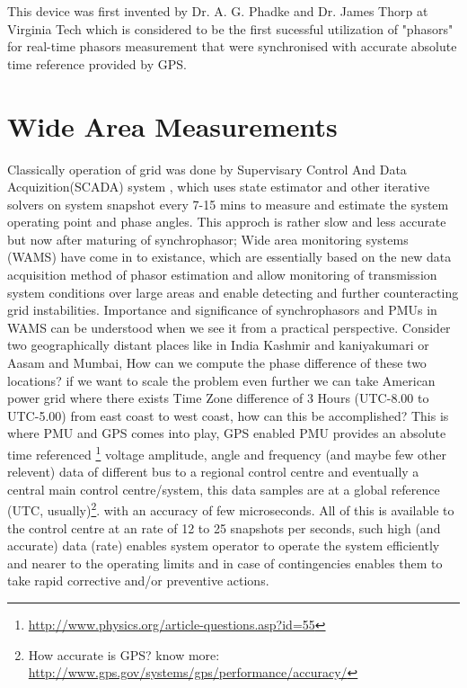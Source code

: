 This device was first invented by Dr. A. G. Phadke and Dr. James Thorp at Virginia Tech which is considered to be the first sucessful utilization of "phasors" for real-time phasors measurement that were synchronised with accurate absolute time reference provided by GPS.

\section{Wide Area Measurements}

Classically operation of grid was done by Supervisary Control And Data Acquizition(SCADA) system , which uses state estimator and other iterative solvers on system snapshot every 7-15 mins to measure and estimate the system operating point and phase angles. This approch is rather slow and less accurate but now after maturing of synchrophasor; Wide area monitoring systems (WAMS) have come in to existance, which are essentially based on the new data acquisition method of phasor estimation and allow monitoring of transmission system conditions over large areas and enable detecting and further counteracting grid instabilities. Importance and significance of synchrophasors and PMUs in WAMS can be understood when we see it from a practical perspective. Consider two geographically distant places like in India Kashmir and kaniyakumari or Aasam and Mumbai, How can we compute the phase difference of these two locations? if we want to scale the problem even further we can take American power grid where there exists Time Zone difference of 3 Hours (UTC-8.00 to UTC-5.00) from east coast to west coast, how can this be accomplished? This is where PMU and GPS comes into play, GPS enabled PMU provides an absolute time referenced \footnote{\url{http://www.physics.org/article-questions.asp?id=55}} voltage amplitude, angle and frequency (and maybe few other relevent) data of different bus to a regional control centre and eventually a central main control centre/system, this data samples are at a global reference (UTC, usually)\footnote{How accurate is GPS? know more: \url{http://www.gps.gov/systems/gps/performance/accuracy/}}. with an accuracy of few microseconds. All of this is available to the control centre at an rate of 12 to 25 snapshots per seconds, such high (and accurate) data (rate) enables system operator to operate the system efficiently and nearer to the operating limits and in case of contingencies enables them to take rapid corrective and/or preventive actions.
